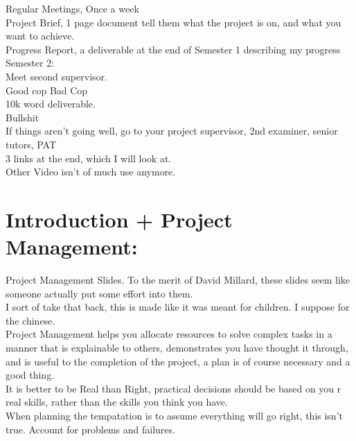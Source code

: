\documentclass [12pt]{article}
\begin{document}
Regular Meetings, Once a week\\

Project Brief, 1 page document tell them what the project is on, and what you want to achieve.\\ 

Progress Report, a deliverable at the end of Semester 1 describing my progress\\

Semester 2:\\

Meet second supervisor.\\ 


Good cop Bad Cop\\

10k word deliverable.\\ 
Bullshit\\ 

If things aren't going well, go to your project supervisor, 2nd examiner, senior tutors, PAT \\ 

3 links at the end, which I will look at.\\

Other Video isn't of much use anymore.\\

\section{Introduction + Project Management: }

Project Management Slides. To the merit of David Millard, these slides 
seem like someone actually put some effort into them.\\ 

I sort of take that back, this is made like it was meant for children. I suppose for the chinese. \\ 


Project Management helps you allocate resources to solve complex tasks in a manner that is explainable to others, demonstrates you have thought it through, and is useful to the completion of the project, a plan is of course necessary and a good thing. \\ 


It is better to be Real than Right, practical decisions should be based on you r real skills, rather than the skills you think you have.\\ 


When planning the tempatation is to assume everything will go right, this isn't true. Account for problems and failures.\\ 
\end{document}
